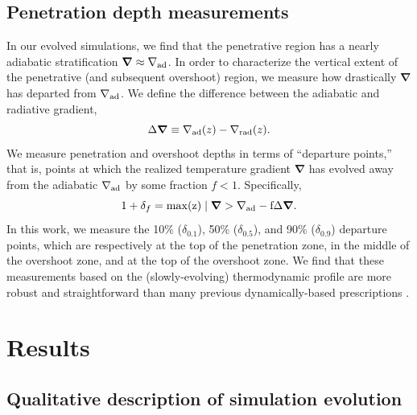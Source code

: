 \documentclass{aastex631}
\newcommand{\gradrad}{\ensuremath{\nabla_{\rm{rad}}}}
\newcommand{\gradad}{\ensuremath{\nabla_{\rm{ad}}}}
\renewcommand{\vec}[1]{\boldsymbol{#1}}
\newcommand{\grad}{\vec{\nabla}}
\begin{document}
\subsection{Penetration depth measurements}
In our evolved simulations, we find that the penetrative region has a nearly adiabatic stratification $\grad \approx \gradad$.
In order to characterize the vertical extent of the penetrative (and subsequent overshoot) region, we measure how drastically $\grad$ has departed from $\gradad$.
We define the difference between the adiabatic and radiative gradient,
\begin{equation}
\Delta\grad \equiv \gradad(z) - \gradrad(z).
\end{equation}
We measure penetration and overshoot depths in terms of ``departure points,'' that is, points at which the realized temperature gradient $\grad$ has evolved away from the adiabatic $\gradad$ by some fraction $f < 1$.
Specifically,
\begin{equation}
1 + \delta_{f} = \rm{max}(z) \mid \grad > \gradad - f\Delta\grad.
\end{equation}
In this work, we measure the 10\% ($\delta_{0.1}$), 50\% ($\delta_{0.5}$), and 90\% ($\delta_{0.9}$) departure points, which are respectively at the top of the penetration zone, in the middle of the overshoot zone, and at the top of the overshoot zone.
We find that these measurements based on the (slowly-evolving) thermodynamic profile are more robust and straightforward than many previous dynamically-based prescriptions \citep[see e.g.,][for a nice discussion]{pratt_etal_2017}.

\section{Results}
\label{sec:results}

\subsection{Qualitative description of simulation evolution}
\end{document}
